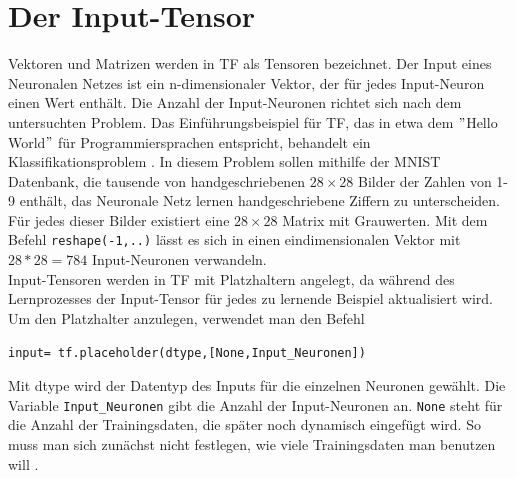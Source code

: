 \section{Der Input-Tensor}
Vektoren und Matrizen werden in \gls{TF} als Tensoren bezeichnet. Der Input eines Neuronalen Netzes ist ein n-dimensionaler Vektor, der f\"ur jedes Input-Neuron einen Wert enth\"alt. Die Anzahl der Input-Neuronen richtet sich nach dem untersuchten Problem. Das Einf\"uhrungsbeispiel f\"ur \gls{TF}, das in etwa dem $"$Hello World$"$ f\"ur Programmiersprachen entspricht, behandelt ein Klassifikationsproblem \cite{handson}. In diesem Problem sollen mithilfe der \gls{MNIST} Datenbank, die tausende von handgeschriebenen $28 \times 28$ Bilder der Zahlen von 1-9 enth\"alt, das Neuronale Netz lernen handgeschriebene Ziffern zu unterscheiden. F\"ur jedes dieser Bilder existiert eine $28 \times 28$ Matrix mit Grauwerten. Mit dem Befehl \lstinline$reshape(-1,..)$ \cite{handson} l\"asst es sich in einen eindimensionalen Vektor mit  $28*28=784$ Input-Neuronen verwandeln.\\
Input-Tensoren werden in \gls{TF} mit Platzhaltern angelegt, da w\"ahrend des Lernprozesses der Input-Tensor f\"ur jedes zu lernende Beispiel aktualisiert wird. Um den Platzhalter anzulegen, verwendet man den Befehl \cite{cookbook}
\vspace{0.3cm}
\begin{lstlisting}
input= tf.placeholder(dtype,[None,Input_Neuronen])
\end{lstlisting}
Mit dtype wird der Datentyp des Inputs f\"ur die einzelnen Neuronen gew\"ahlt. Die Variable \lstinline$Input_Neuronen$ gibt die Anzahl der Input-Neuronen an. \lstinline$None$ steht f\"ur die Anzahl der Trainingsdaten, die sp\"ater noch dynamisch eingef\"ugt wird. So muss man sich zun\"achst nicht festlegen, wie viele Trainingsdaten man benutzen will \cite{handson}. 



